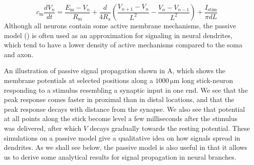 \begin{equation}
c_\text{m} \frac{dV_n}{dt} = \frac{E_\text{m}-V_n}{R_\text{m}} + \frac{d}{4R_\text{a}}\left(\frac{V_{n+1}-V_n}{L^2} - \frac{V_n-V_{n-1}}{L^2} \right) + \frac{I_\text{stim}}{\pi d L}
\label{eq:Neuron:multipassive}
\end{equation}
Although all neurons contain some active membrane mechanisms, the passive model () is often used as an approximation for signaling in neural dendrites, which tend to have a lower density of active mechanisms compared to the soma and axon. 

An illustration of passive signal propagation shown in A, which shows the membrane potentials at selected positions along a $1000 \, \si{\micro\metre}$ long stick-neuron responding to a stimulus resembling a synaptic input in one end. We see that the peak response comes faster in proximal than in distal locations, and that the peak response decays with distance from the synapse. We also see that potential at all points along the stick become level a few milliseconds after the stimulus was delivered, after which $V$ decays gradually towards the resting potential. These simulations on a passive model give a qualitative idea on how signals spread in dendrites. As we shall see below, the passive model is also useful in that it allows us to derive some analytical results for signal propagation in neural branches.

